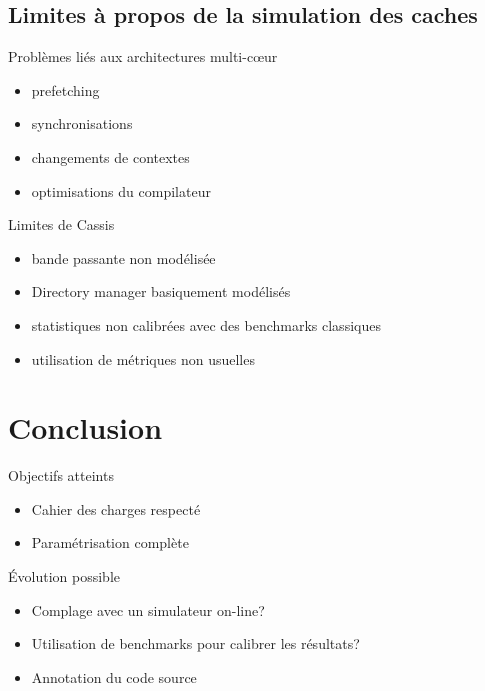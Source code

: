 \subsection{Limites \`a  propos de la simulation des caches}
\begin{frame}
  \begin{block}{Probl\`emes li\'es aux architectures multi-c{\oe}ur}
    \begin{itemize}
      \item \textsf{prefetching}
      \item synchronisations
      \item changements de contextes 
      \item optimisations du compilateur
    \end{itemize}
  \end{block}
  \begin{block}{Limites de \textsf{Cassis}}
    \begin{itemize}
      \item bande passante non mod\'elis\'ee
      \item \textsf{Directory manager} basiquement mod\'elis\'es
      \item statistiques non calibr\'ees avec des benchmarks classiques
      \item utilisation de m\'etriques non usuelles
    \end{itemize}
  \end{block}
\end{frame}


\section*{Conclusion}
\begin{frame}
  \begin{block}{Objectifs atteints}
    \begin{itemize}
      \item Cahier des charges respect\'e
      \item Param\'etrisation compl\`ete
    \end{itemize}
  \end{block}

  \begin{block}{\'Evolution possible}
    \begin{itemize}
      \item Complage avec un simulateur \textsf{on-line}?
      \item Utilisation de benchmarks pour calibrer les r\'esultats?
      \item Annotation du code source
    \end{itemize}
  \end{block}
\end{frame}
